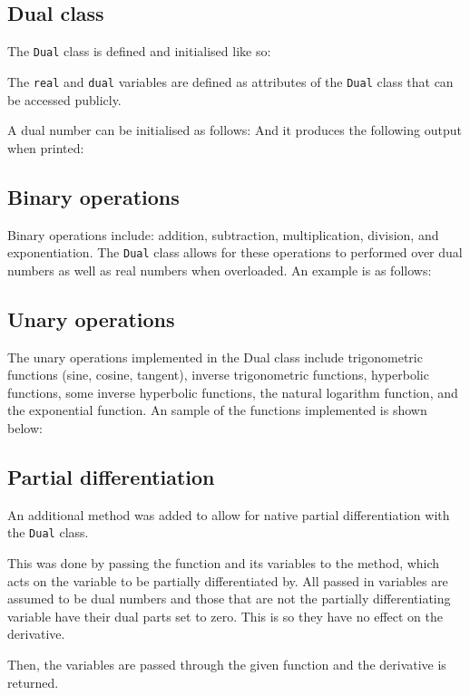 \documentclass[11pt,a4paper]{article}
\begin{document}
\subsection{Dual class}
The \texttt{Dual} class is defined and initialised like so:

The \texttt{real} and \texttt{dual} variables are defined as attributes of the \texttt{Dual} class that can be accessed publicly.

A dual number can be initialised as follows:
And it produces the following output when printed:
\newpage
\subsection{Binary operations}
Binary operations include: addition, subtraction, multiplication, division, and exponentiation. The \texttt{Dual} class allows for these operations to performed over dual numbers as well as real numbers when overloaded.
An example is as follows:
\newpage
\subsection{Unary operations}
The unary operations implemented in the Dual class include trigonometric functions (sine, cosine, tangent), inverse trigonometric functions, hyperbolic functions, some inverse hyperbolic functions, the natural logarithm function, and the exponential function.
An sample of the functions implemented is shown below:
\newpage
\subsection{Partial differentiation}
An additional method was added to allow for native partial differentiation with the \texttt{Dual} class. 

This was done by passing the function and its variables to the method, which acts on the variable to be partially differentiated by. All passed in variables are assumed to be dual numbers and those that are not the partially differentiating variable have their dual parts set to zero. This is so they have no effect on the derivative.

Then, the variables are passed through the given function and the derivative is returned.
\end{document}
